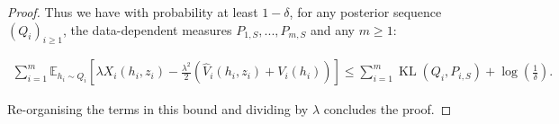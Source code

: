 \begin{proof}
 Thus we have with probability at least $1-\delta$, for any posterior sequence $(Q_i)_{i\geq 1}$, the data-dependent measures $P_{1,S},...,P_{m,S}$ and any $m\geq 1$:

 \begin{align*}
  \sum_{i=1}^m \mathbb{E}_{h_i\sim Q_i}\left[\lambda X_i(h_i,z_i)  - \frac{\lambda^2}{2}(\hat{V}_i(h_i,z_i) + V_i(h_i))\right] \leq \sum_{i=1}^m \operatorname{KL}(Q_i,P_{i,S}) + \log \left( \frac{1}{\delta}  \right).
 \end{align*}

 Re-organising the terms in this bound and dividing by $\lambda$ concludes the proof.

 \end{proof}

\newpage

